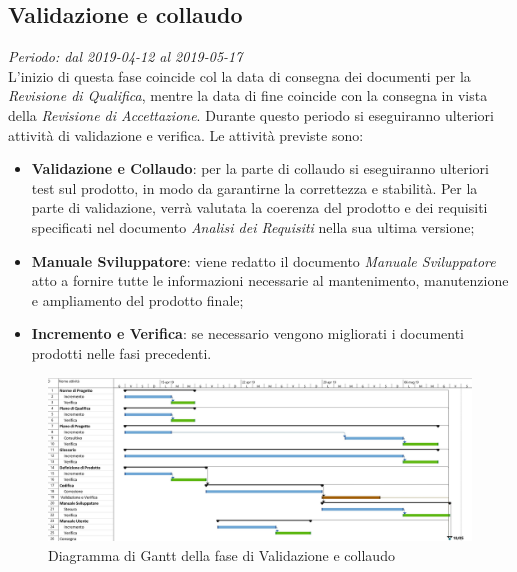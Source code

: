 \subsection{Validazione e collaudo}
\textit{Periodo: dal 2019-04-12 al 2019-05-17 } \\
L'inizio di questa fase coincide col la data di consegna dei documenti per la 
\textit{Revisione di Qualifica}, mentre la data di fine coincide con la 
consegna in vista della \textit{Revisione di Accettazione}. Durante questo periodo 
si eseguiranno ulteriori attività di validazione e verifica. Le attività 
previste sono: 
\begin{itemize}
	\item \textbf{Validazione e Collaudo}: per la parte di collaudo si 
	eseguiranno ulteriori test sul prodotto, in modo da garantirne la 
	correttezza e stabilità. Per la parte di validazione, verrà 
	valutata la coerenza del prodotto e dei requisiti specificati nel documento 
	\textit{Analisi dei Requisiti} nella sua ultima versione;
	\item \textbf{Manuale Sviluppatore}: viene redatto il documento \textit{Manuale Sviluppatore} atto a fornire tutte le informazioni necessarie al mantenimento, manutenzione e ampliamento del prodotto finale;
	\item \textbf{Incremento e Verifica}: se necessario vengono migliorati i 
	documenti prodotti nelle fasi precedenti.
\end{itemize}
\begin{figure}[H]
	\includegraphics[width=0.99\linewidth]{res/images/gantt_val.jpg}
	\caption{Diagramma di Gantt della fase di Validazione e collaudo}
\end{figure}